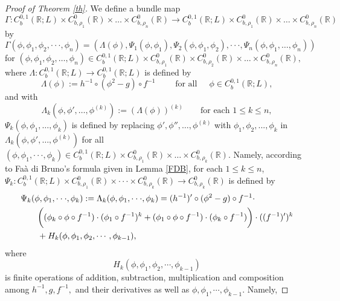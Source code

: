 \documentclass[11pt,reqno,a4paper]{amsart}
\numberwithin{equation}{section}
\begin{document}
\begin{proof}[Proof of Theorem \ref{th}]
We define a bundle map
\begin{equation}\label{L}
\Gamma:C_{b}^{0,1}(\mathbb{R};L)\times  C_{b,\rho_1}^0(\mathbb{R}) \times  \dots \times C_{b,\rho_n}^0(\mathbb{R})\rightarrow C_{b}^{0,1}(\mathbb{R};L) \times C_{b,\rho_1}^0(\mathbb{R})\times\dots\times C_{b,\rho_n}^0(\mathbb{R})
\end{equation}
by
$$\Gamma(\phi,\phi_{1},\phi_{2},\cdot\cdot \cdot,\phi_{n})=(\Lambda(\phi),\Psi_1(\phi,\phi_1),\Psi_2(\phi,\phi_1,\phi_2),\cdot\cdot \cdot,\Psi_n(\phi,\phi_1,\dots,\phi_n))$$
for $(\phi,\phi_{1},\phi_{2},\dots,\phi_n)\in C_{b}^{0,1}(\mathbb{R};L)\times  C_{b,\rho_1}^0(\mathbb{R}) \times  C_{b,\rho_2}^0(\mathbb{R})\times \dots\times C_{b,\rho_n}^0(\mathbb{R}),$
where $\Lambda:C_{b}^{0,1}(\mathbb{R};L)\rightarrow C_{b}^{0,1}(\mathbb{R};L)$ is defined by
\begin{equation}\label{qq}
\Lambda(\phi):=h^{-1}\circ(\phi^{2}-g)  \circ f^{-1} \qquad \text{~for all ~~}~~\phi \in C_{b}^{0,1}(\mathbb{R};L),
\end{equation}
and with $$\Lambda_k(\phi,\phi',\dots,\phi^{(k)}):=(\Lambda(\phi))^{(k)} \qquad\text{for each } 1 \le k \le n,$$ 
$\Psi_k(\phi,\phi_1,\dots,\phi_k)$ is defined by replacing $\phi',\phi'',\dots,\phi^{(k)}$ with $\phi_1,\phi_2,...,\phi_k$ in \newline $\Lambda_k(\phi,\phi',\dots,\phi^{(k)})$ for all $(\phi,\phi_1,\cdot\cdot \cdot,\phi_k) \in C_{b}^{0,1}(\mathbb{R};L)\times  C_{b,\rho_1}^0(\mathbb{R}) \times\dots\times  C_{b,\rho_k}^0(\mathbb{R}).$ 
Namely, according to Fa\`a di Bruno’s formula given in Lemma \ref{FDB}, for each  $1 \le k \le n$,
$\Psi_k:C_{b}^{0,1}(\mathbb{R};L)\times  C_{b,\rho_1}^0(\mathbb{R})\times\cdot\cdot \cdot\times C_{b,\rho_k}^0(\mathbb{R})  \rightarrow  C_{b,\rho_k}^0(\mathbb{R}) $ is defined by 
\begin{align}
&\Psi_k(\phi,\phi_1,\cdot\cdot \cdot,\phi_k):=\Lambda_k(\phi,\phi_1,\cdot\cdot \cdot,\phi_k)     =(h^{-1})'\circ (\phi^{2}  -g)\circ f^{-1} \cdot \notag\\
& \qquad \bigg( (\phi_k \circ \phi \circ f^{-1} )\cdot (\phi_1 \circ f^{-1})^k + (\phi_1\circ \phi \circ f^{-1}) \cdot (\phi_k \circ f^{-1})\bigg) \cdot ((f^{-1})')^k\notag
\\
& \qquad +H_k(\phi,\phi_1,\phi_2,\cdots,\phi_{k-1}), \label{psik}
\end{align}
where
\[H_k(\phi,\phi_1,\phi_2,\cdots,\phi_{k-1})\]
is finite operations of addition, subtraction, multiplication and composition among $h^{-1}, g, f^{-1},$ and their derivatives as well as $\phi, \phi_1,\cdots,\phi_{k-1}$. Namely,

\end{proof}
\end{document}
